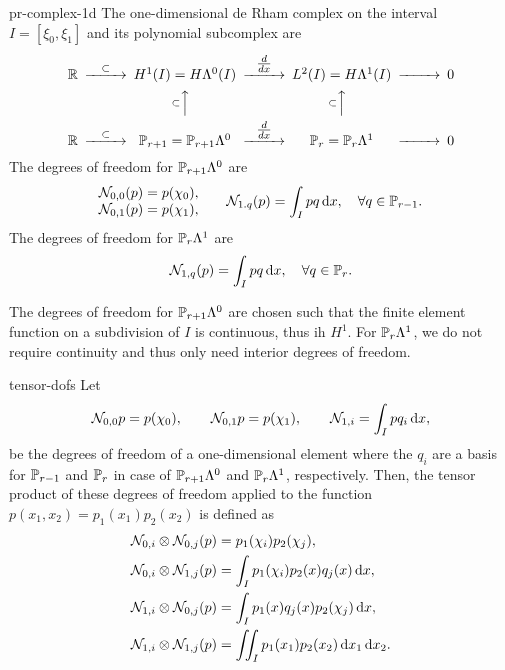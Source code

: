 \begin{Definition}{pr-complex-1d}
  The one-dimensional de Rham complex on the interval $I = [\xi_0,\xi_1]$ and
  its polynomial subcomplex are
  \begin{gather}
    \begin{CD}
    \R
    @>{\subset}>>
    H^1(I) = H\Lambda^0(I)
    @>{\tfrac{d}{dx}}>>
    L^2(I) = H\Lambda^1(I)
    @>>> 0
    \\
    @.
    @A{\subset}AA
    @A{\subset}AA
    \\
    \R
    @>{\subset}>>
    \P_{r+1} = \P_{r+1}\Lambda^0
    @>{\tfrac{d}{dx}}>>
    \P_r = \P_r\Lambda^1
    @>>> 0
    \end{CD}
  \end{gather}
  The degrees of freedom for $\P_{r+1}\Lambda^0$ are
  \begin{gather}
    \begin{matrix}
    \nodal_{0,0}(p) = p(\chi_0),\\
    \nodal_{0,1}(p) = p(\chi_1),
    \end{matrix}\qquad
    \nodal_{1.q}(p) = \int_{I} p q \dx,\quad\forall q\in\P_{r-1}.
  \end{gather}
  The degrees of freedom for $\P_{r}\Lambda^1$ are
  \begin{gather}
    \nodal_{1,q}(p) = \int_{I} p q \dx,\quad\forall q\in\P_{r}.
  \end{gather}
\end{Definition}

\begin{remark}
  The degrees of freedom for $\P_{r+1}\Lambda^0$ are chosen such that
  the finite element function on a subdivision of $I$ is continuous,
  thus ih $H^1$. For $\P_{r}\Lambda^1$, we do not require continuity
  and thus only need interior degrees of freedom.
\end{remark}

\begin{Definition}{tensor-dofs}
  Let
  \begin{gather}
    \nodal_{0,0} p = p(\chi_0),\qquad \nodal_{0,1} p = p(\chi_1), \qquad
    \nodal_{1,i} = \int_I p q_i\dx,
  \end{gather}
  be the degrees of freedom of a one-dimensional element where the
  $q_i$ are a basis for $\P_{r-1}$ and $\P_r$ in case of
  $\P_{r+1}\Lambda^0$ and $\P_{r}\Lambda^1$, respectively. Then, the
  tensor product of these degrees of freedom applied to the function
  $p(x_1,x_2) = p_1(x_1)p_2(x_2)$ is defined as
  \begin{gather}
    \begin{split}
      \nodal_{0,i}\otimes\nodal_{0,j}(p) &= p_1(\chi_i) p_2(\chi_j),\\
      \nodal_{0,i}\otimes\nodal_{1,j}(p) &= \int_I p_1(\chi_i)  p_2(x)q_j(x)\dx,\\
      \nodal_{1,i}\otimes\nodal_{0,j}(p) &= \int_I p_1(x)q_j(x) p_2(\chi_j) \dx,\\
      \nodal_{1,i}\otimes\nodal_{1,j}(p) &= \iint_I p_1(x_1)
      p_2(x_2) \dx_1\dx_2.
    \end{split}
  \end{gather}
\end{Definition}

